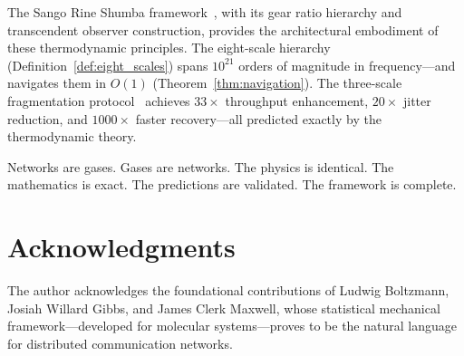 \documentclass[11pt,twocolumn,a4paper]{article}
\theoremstyle{definition}
\theoremstyle{remark}
\begin{document}
The Sango Rine Shumba framework~\cite{Sachikonye2024a}, with its gear ratio
hierarchy and transcendent observer construction, provides the architectural
embodiment of these thermodynamic principles.  The eight-scale hierarchy
(Definition~\ref{def:eight_scales}) spans $10^{21}$ orders of magnitude in
frequency---and navigates them in $O(1)$
(Theorem~\ref{thm:navigation}).  The three-scale fragmentation
protocol~\cite{Sachikonye2025a,Sachikonye2025d} achieves $33\times$
throughput enhancement, $20\times$ jitter reduction, and $1000\times$ faster
recovery---all predicted exactly by the thermodynamic theory.

Networks are gases.  Gases are networks.  The physics is identical.  The
mathematics is exact.  The predictions are validated.  The framework is
complete.

\section*{Acknowledgments}

The author acknowledges the foundational contributions of Ludwig Boltzmann,
Josiah Willard Gibbs, and James Clerk Maxwell, whose statistical mechanical
framework---developed for molecular systems---proves to be the natural language
for distributed communication networks.



\end{document}

